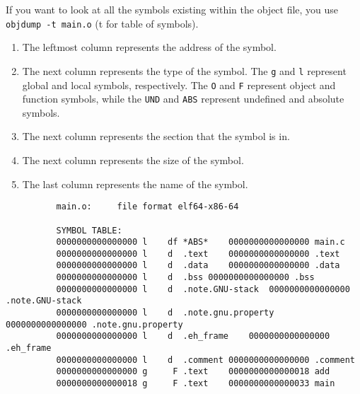       \begin{theorem}
        If you want to look at all the symbols existing within the object file, you use \texttt{objdump -t main.o} (t for table of symbols). 
        \begin{enumerate}
          \item The leftmost column represents the address of the symbol. 
          \item The next column represents the type of the symbol. The \texttt{g} and \texttt{l} represent global and local symbols, respectively. The \texttt{O} and \texttt{F} represent object and function symbols, while the \texttt{UND} and \texttt{ABS} represent undefined and absolute symbols. 
          \item The next column represents the section that the symbol is in. 
          \item The next column represents the size of the symbol. 
          \item The last column represents the name of the symbol. 
        \end{enumerate}
        \begin{lstlisting}
          main.o:     file format elf64-x86-64

          SYMBOL TABLE:
          0000000000000000 l    df *ABS*	0000000000000000 main.c
          0000000000000000 l    d  .text	0000000000000000 .text
          0000000000000000 l    d  .data	0000000000000000 .data
          0000000000000000 l    d  .bss	0000000000000000 .bss
          0000000000000000 l    d  .note.GNU-stack	0000000000000000 .note.GNU-stack
          0000000000000000 l    d  .note.gnu.property	0000000000000000 .note.gnu.property
          0000000000000000 l    d  .eh_frame	0000000000000000 .eh_frame
          0000000000000000 l    d  .comment	0000000000000000 .comment
          0000000000000000 g     F .text	0000000000000018 add
          0000000000000018 g     F .text	0000000000000033 main
        \end{lstlisting}
      \end{theorem}

